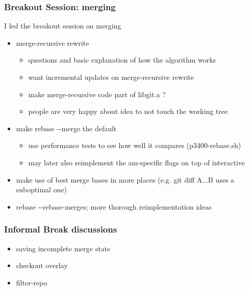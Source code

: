 \documentclass[t]{beamer}
\begin{document}
\begin{frame}
  \frametitle{Breakout Session: merging}

  I led the breakout session on merging
  \begin{itemize}
    \item merge-recursive rewrite
      \begin{itemize}
      \item questions and basic explanation of how the algorithm works
      \item want incremental updates on merge-recursive rewrite
      \item make merge-recursive code part of libgit.a ?
      \item people are very happy about idea to not touch the working tree
      \end{itemize}
    \item make rebase {-}{-}merge the default
      \begin{itemize}
      \item use performance tests to see how well it compares (p3400-rebase.sh)
      \item may later also reimplement the am-specific flags on top of
        interactive
      \end{itemize}
    \item make use of best merge bases in more places (e.g. git diff A...B uses
          a suboptimal one)
    \item rebase {-}{-}rebase-merges; more thorough reimplementation ideas
    
  \end{itemize}

\end{frame}


\begin{frame}
  \frametitle{Informal Break discussions}

  \begin{itemize}
    \item saving incomplete merge state
    \item checkout overlay
    \item filter-repo
  \end{itemize}

\end{frame}

\end{document}
